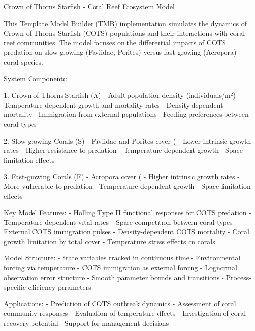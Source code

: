 Crown of Thorns Starfish - Coral Reef Ecosystem Model

This Template Model Builder (TMB) implementation simulates the dynamics of Crown of Thorns Starfish (COTS) populations and their interactions with coral reef communities. The model focuses on the differential impacts of COTS predation on slow-growing (Faviidae, Porites) versus fast-growing (Acropora) coral species.

System Components:

1. Crown of Thorns Starfish (A) - Adult population density (individuals/m²)
- Temperature-dependent growth and mortality rates
- Density-dependent mortality
- Immigration from external populations
- Feeding preferences between coral types

2. Slow-growing Corals (S) - Faviidae and Porites cover (%
- Lower intrinsic growth rates
- Higher resistance to predation
- Temperature-dependent growth
- Space limitation effects

3. Fast-growing Corals (F) - Acropora cover (%
- Higher intrinsic growth rates
- More vulnerable to predation
- Temperature-dependent growth
- Space limitation effects

Key Model Features:
- Holling Type II functional responses for COTS predation
- Temperature-dependent vital rates
- Space competition between coral types
- External COTS immigration pulses
- Density-dependent COTS mortality
- Coral growth limitation by total cover
- Temperature stress effects on corals

Model Structure:
- State variables tracked in continuous time
- Environmental forcing via temperature
- COTS immigration as external forcing
- Lognormal observation error structure
- Smooth parameter bounds and transitions
- Process-specific efficiency parameters

Applications:
- Prediction of COTS outbreak dynamics
- Assessment of coral community responses
- Evaluation of temperature effects
- Investigation of coral recovery potential
- Support for management decisions

